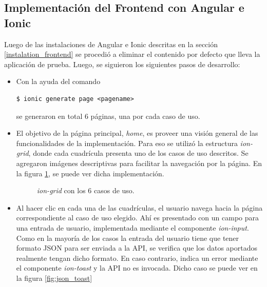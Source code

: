 \subsection{Implementación del Frontend con Angular e Ionic}
Luego de las instalaciones de Angular e Ionic descritas en la sección \ref{instalation_frontend} se procedió a eliminar el contenido por defecto que lleva la aplicación de prueba. Luego, se siguieron los siguientes pasos de desarrollo:
\begin{itemize}
    \item Con la ayuda del comando
    \begin{verbatim}
$ ionic generate page <pagename>
    \end{verbatim}
se generaron en total 6 páginas, una por cada caso de uso.
    \item El objetivo de la página principal, \textit{home}, es proveer una visión general de las funcionalidades de la implementación. Para eso se utilizó la estructura \textit{ion-grid}, donde cada cuadrícula presenta uno de los casos de uso descritos. Se agregaron imágenes descriptivas para facilitar la navegación por la página. En la figura \ref{fig:home_page}, se puede ver dicha implementación.
    \begin{figure}[H]
        \caption{\textit{ion-grid} con los 6 casos de uso.}
        \label{fig:home_page}
    \end{figure}
    \item Al hacer clic en cada una de las cuadrículas, el usuario navega hacia la página correspondiente al caso de uso elegido. Ahí es presentado con un campo para una entrada de usuario, implementada mediante el componente \textit{ion-input}. Como en la mayoría de los casos la entrada del usuario tiene que tener formato JSON para ser enviada a la API, se verifica que los datos aportados realmente tengan dicho formato. En caso contrario, indica un error mediante el componente \textit{ion-toast} y la API no es invocada. Dicho caso se puede ver en la figura \ref{fig:json_toast}

\end{itemize}
